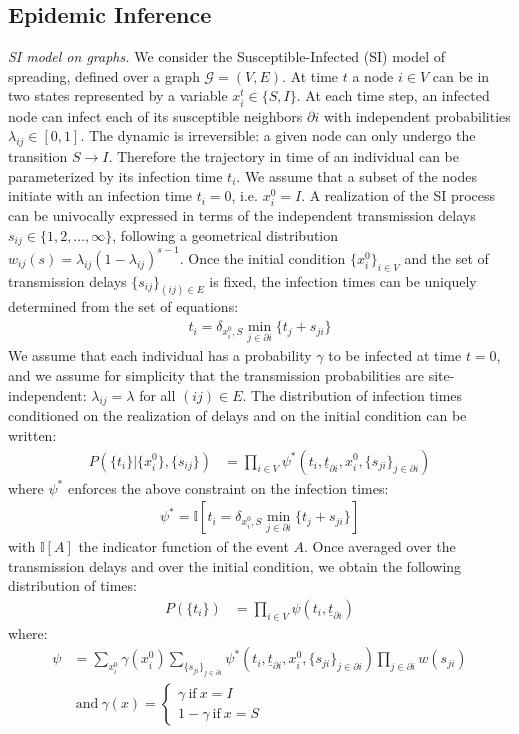 \documentclass[a4paper, amsfonts, amssymb, amsmath, reprint, showkeys, nofootinbib, twoside, floatfix, pre,superscriptaddress]{revtex4-2}
\begin{document}
\subsection{Epidemic Inference}
{\it SI model on graphs.}
We consider the Susceptible-Infected (SI) model of spreading, defined over a graph $\mathcal{G}=(V,E)$.
At time $t$ a node $i\in V$ can be in two states represented by a variable $x_i^t\in\{S,I\}$.
At each time step, an infected node can infect each of its susceptible neighbors $\partial i$ with independent probabilities $\lambda_{ij}\in[0,1]$.
The dynamic is irreversible: a given node can only undergo the transition $S\to I$. 
Therefore the trajectory in time of an individual can be parameterized by its infection time $t_i$.
We assume that a subset of the nodes initiate with an infection time $t_i=0$, i.e. $x_i^0=I$.
A realization of the SI process can be univocally expressed in terms of the independent transmission delays $s_{ij}\in\{1,2, \dots, \infty\}$, following a geometrical distribution $w_{ij}(s)=\lambda_{ij}(1-\lambda_{ij})^{s-1}$.
Once the initial condition $\{x_i^0\}_{i\in V}$ and the set of transmission delays $\{s_{ij}\}_{(ij)\in E}$ is fixed, the infection times can be uniquely determined from the set of equations:
\begin{align}
\label{eq:equation_infected_times}
	t_i=\delta_{x_i^0,S}\min_{j\in\partial i}\{t_j+s_{ji}\}
\end{align}
We assume that each individual has a probability $\gamma$ to be infected at time $t=0$, and we assume for simplicity that the transmission probabilities are site-independent: $\lambda_{ij}=\lambda$ for all $(ij)\in E$.
The distribution of infection times conditioned on the realization of delays and on the initial condition can be written:
\begin{align*}
	P(\{t_i\}|\{x_i^0\},\{s_{ij}\})&=\prod_{i\in V}	\psi^*(t_i, \underline{t}_{\partial i}, x_i^0, \{s_{ji}\}_{j\in\partial i}) 
\end{align*}
where $\psi^*$ enforces the above constraint on the infection times:
\begin{align}
	\label{eq:constraint_infection_times}
	\psi^*=\mathbb{I}[t_i=\delta_{x_i^0,S}\min_{j\in\partial i}\{t_j+s_{ji}\}]
\end{align}
with $\mathbb{I}[A]$ the indicator function of the event $A$.
Once averaged over the transmission delays and over the initial condition, we obtain the following distribution of times:
\begin{align}
	\label{eq:forward_averaged}
	P(\{t_i\})&=\prod_{i\in V}\psi(t_i, \underline{t}_{\partial i})
\end{align}
where:
\begin{align*}
	\psi&=\sum_{x_i^0}\gamma(x_i^0)\sum_{\{s_{ji}\}_{j\in\partial i}}\psi^*(t_i, \underline{t}_{\partial i}, x_i^0, \{s_{ji}\}_{j\in\partial i})\prod_{j\in\partial i}w(s_{ji})\\
	&\ \text{and} \ \gamma(x) = \begin{cases}
		\gamma \ \text{if} \ x=I \\
		1-\gamma \ \text{if} \ x=S
	\end{cases}
\end{align*}
\end{document}
